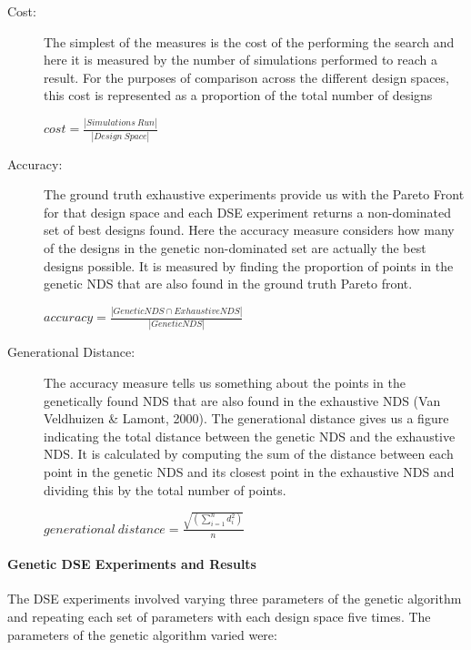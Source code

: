 \begin{description}
\item[Cost:] The simplest of the measures is the cost of the performing the search and here it is measured by the number of simulations performed to reach a result. For the purposes of comparison across the different design spaces, this cost is represented as a proportion of the total number of designs

$cost = \frac{|Simulations\ Run|}{|Design\ Space|}$

\item[Accuracy:] The ground truth exhaustive experiments provide us with the Pareto Front for that design space and each DSE experiment returns a non-dominated set of best designs found.  Here the accuracy measure considers how many of the designs in the genetic non-dominated set are actually the best designs possible. It is measured by finding the proportion of points in the genetic NDS that are also found in the ground truth Pareto front.

$accuracy = \frac{|GeneticNDS \cap ExhaustiveNDS|}{|GeneticNDS|}$

\item[Generational Distance:] The accuracy measure tells us something about the points in the genetically found NDS that are also found in the exhaustive NDS (Van Veldhuizen \& Lamont, 2000).  The generational distance gives us a figure indicating the total distance between the genetic NDS and the exhaustive NDS. It is calculated by computing the sum of the distance between each point in the genetic NDS and its closest point in the exhaustive NDS and dividing this by the total number of points.


$generational\ distance = \frac{\sqrt{(\sum_{i=1}^{n} d_{i}^{2})}}{n}$

\end{description}
\paragraph{Genetic DSE Experiments and Results}
The DSE experiments involved varying three parameters of the genetic algorithm and repeating each set of parameters with each design space five times.  The parameters of the genetic algorithm varied were:

